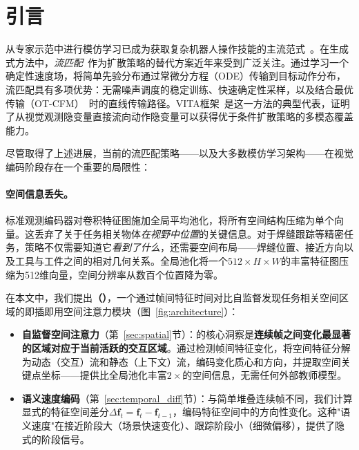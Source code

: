 \section{引言}
\label{sec:introduction}

从专家示范中进行模仿学习已成为获取复杂机器人操作技能的主流范式~\cite{chi2023diffusion,zhao2023act,brohan2023rt2}。在生成式方法中，\emph{流匹配}~\cite{lipman2023flow,tong2024improving}作为扩散策略的替代方案近年来受到广泛关注。通过学习一个确定性速度场，将简单先验分布通过常微分方程（ODE）传输到目标动作分布，流匹配具有多项优势：无需噪声调度的稳定训练、快速确定性采样，以及结合最优传输（OT-CFM）~\cite{tong2024improving}时的直线传输路径。VITA框架~\cite{gao2026vita}是这一方法的典型代表，证明了从视觉观测隐变量直接流向动作隐变量可以获得优于条件扩散策略的多模态覆盖能力。

尽管取得了上述进展，当前的流匹配策略——以及大多数模仿学习架构——在视觉编码阶段存在一个重要的局限性：

\paragraph{空间信息丢失。}标准观测编码器对卷积特征图施加全局平均池化，将所有空间结构压缩为单个向量。这丢弃了关于任务相关物体\emph{在视野中位置}的关键信息。对于焊缝跟踪等精密任务，策略不仅需要知道它\emph{看到了什么}，还需要空间布局——焊缝位置、接近方向以及工具与工件之间的相对几何关系。全局池化将一个$512 \times H \times W$的丰富特征图压缩为512维向量，空间分辨率从数百个位置降为零。

在本文中，我们提出\textbf{\fasafull{}（\fasa{}）}，一个通过帧间特征时间对比自监督发现任务相关空间区域的即插即用空间注意力模块（图~\ref{fig:architecture}）：

\begin{itemize}[leftmargin=*,itemsep=4pt]
    \item \textbf{自监督空间注意力}（第~\ref{sec:spatial}节）：\fasa{}的核心洞察是\textbf{连续帧之间变化最显著的区域对应于当前活跃的交互区域}。通过检测帧间特征变化，\fasa{}将空间特征分解为动态（交互）流和静态（上下文）流，编码变化质心和方向，并提取空间关键点坐标——提供比全局池化丰富$2\times$的空间信息，无需任何外部教师模型。

    \item \textbf{语义速度编码}（第~\ref{sec:temporal_diff}节）：与简单堆叠连续帧不同，我们计算显式的特征空间差分$\Delta \bm{f}_t = \bm{f}_t - \bm{f}_{t-1}$，编码特征空间中的方向性变化。这种"语义速度"在接近阶段大（场景快速变化）、跟踪阶段小（细微偏移），提供了隐式的阶段信号。
\end{itemize}

